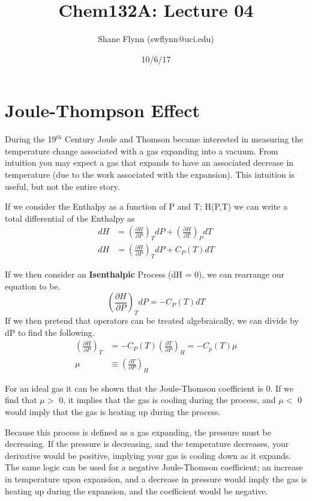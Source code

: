 \documentclass{article}
\title{Chem132A: Lecture 04}
\author{Shane Flynn (swflynn@uci.edu) }
\date{10/6/17}
\newcommand{\be}{\begin{equation}}
\newcommand{\ee}{\end{equation}}
\newcommand{\pd}{\partial}
\begin{document}
\maketitle

\section*{Joule-Thompson Effect}
During the 19$^{th}$ Century Joule and Thomson became interested in measuring the temperature change associated with a gas expanding into a vacuum. 
From intuition you may expect a gas that expands to have an associated decrease in temperature (due to the work associated with the expansion). 
This intuition is useful, but not the entire story. 

If we consider the Enthalpy as a function of P and T; H(P,T) we can write a total differential of the Enthalpy as
\be
\begin{split}
dH &= \left(\frac{\pd H}{\pd P}\right)_T dP + \left(\frac{\pd H}{\pd T}\right)_P dT \\
dH &= \left(\frac{\pd H}{\pd P}\right)_T dP + C_P(T) dT
\end{split}
\ee

If we then consider an \textbf{Isenthalpic} Process (dH = 0), we can rearrange our equation to be. 
\be
\left(\frac{\pd H}{\pd P}\right)_T dP = -C_P(T) dT
\ee
If we then pretend that operators can be treated algebraically, we can divide by dP to find the following. 
\be
\begin{split}
\left(\frac{\pd H}{\pd P}\right)_T &= -C_P(T)\left(\frac{\pd T}{\pd P}\right)_H = -C_p(T) \mu\\
\mu &\equiv \left(\frac{\pd T}{\pd P}\right)_H 
\end{split}
\ee

For an ideal gas it can be shown that the Joule-Thomson coefficient is 0. 
If we find that $\mu >$ 0, it implies that the gas is cooling during the process, and $\mu <$ 0 would imply that the gas is heating up during the process. 

Because this process is defined as a gas expanding, the pressure must be decreasing. 
If the pressure is decreasing, and the temperature decreases, your derivative would be positive, implying your gas is cooling down as it expands. 
The same logic can be used for a negative Joule-Thomson coefficient; an increase in temperature upon expansion, and a decrease in pressure would imply the gas is heating up during the expansion, and the coefficient would be negative. 
\end{document}
